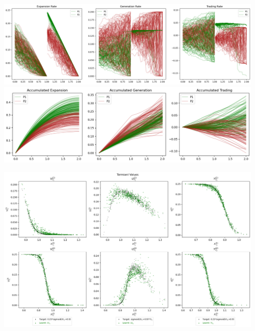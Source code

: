 \documentclass[a4paper,10pt]{article}
\newcommand{\1}{\mathbf{1}}
\begin{document}
\begin{minipage}[ht]{\textwidth}
  \centering
  \begin{minipage}[ht]{0.75\textwidth} 
    \centering
    \includegraphics{FinalReports/Illustration_diagrams/Seprt-2A2P-Sigmoid-ResExamples/Rates.png}\\
    \includegraphics{FinalReports/Illustration_diagrams/Joint-2A2P-Sigmoid-ResExamples/AccumRates.png}\\
    \label{fig:decomp-gen-jnt}
  \end{minipage}

  \begin{minipage}[ht]{0.8\textwidth}
    \centering
    \includegraphics{FinalReports/Illustration_diagrams/Joint-2A2P-Sigmoid-ResExamples/sigmoid_target.png}\\
    \label{fig:terminal-values-jnt}
  \end{minipage}
  \vspace{-10pt}
\end{minipage}
\end{document}
